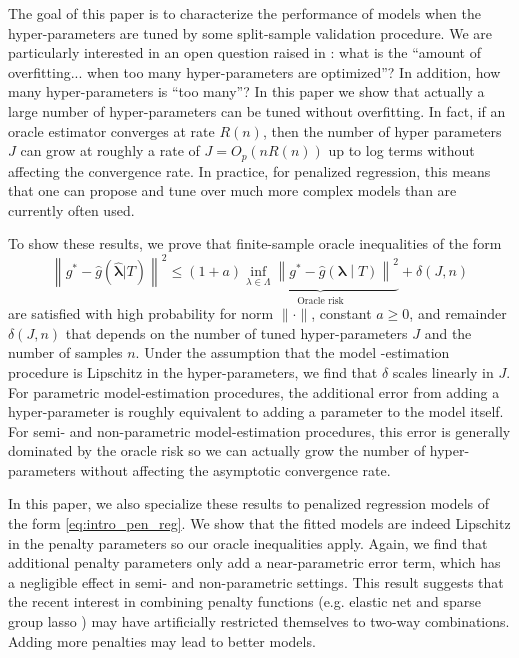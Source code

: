 \documentclass[12pt]{article} %
\theoremstyle{definition}
\begin{document}
The goal of this paper is to characterize the performance of models when the hyper-parameters are tuned by some split-sample validation procedure. We are particularly interested in an open question raised in \citet{bengio2000gradient}: what is the ``amount of overfitting... when too many hyper-parameters are optimized''? In addition, how many hyper-parameters is ``too many''? In this paper we show that actually a large number of hyper-parameters can be tuned without overfitting. In fact, if an oracle estimator converges at rate $R(n)$, then the number of hyper parameters $J$ can grow at roughly a rate of $J = O_p(nR(n))$ up to log terms without affecting the convergence rate. In practice, for penalized regression, this means that one can propose and tune over much more complex models than are currently often used.

To show these results, we prove that finite-sample oracle inequalities of the form
\begin{equation}
\label{thrm:intro_oracle_ineq}
\left \| g^* - \hat{g} (\hat{\boldsymbol{\lambda}} | T ) \right \|^2
\le
(1+a)
\underbrace{\inf_{\lambda \in \Lambda} \left \| g^* - \hat{g}\left (\boldsymbol{\lambda} \middle | T \right ) \right \|^2}_{\text{Oracle risk}}
+ \delta \left(J,n\right)
\end{equation}
are satisfied with high probability for norm $\| \cdot \|$, constant $a \ge 0$, and remainder $\delta(J,n)$ that depends on the number of tuned hyper-parameters $J$ and the number of samples $n$.
Under the assumption that the model -estimation procedure is Lipschitz in the hyper-parameters, we find that $\delta$ scales linearly in $J$.
For parametric model-estimation procedures, the additional error from adding a hyper-parameter is roughly equivalent to adding a parameter to the model itself.
For semi- and non-parametric model-estimation procedures, this error is generally dominated by the oracle risk so we can actually grow the number of hyper-parameters without affecting the asymptotic convergence rate.

In this paper, we also specialize these results to penalized regression models of the form \eqref{eq:intro_pen_reg}.
We show that the fitted models are indeed Lipschitz in the penalty parameters so our oracle inequalities apply. 
Again, we find that additional penalty parameters only add a near-parametric error term, which has a negligible effect in semi- and non-parametric settings. This result suggests that the recent interest in combining penalty functions (e.g. elastic net and sparse group lasso \citep{zou2003regression, simon2013sparse}) may have artificially restricted themselves to two-way combinations. Adding more penalties may lead to better models.
\end{document}
